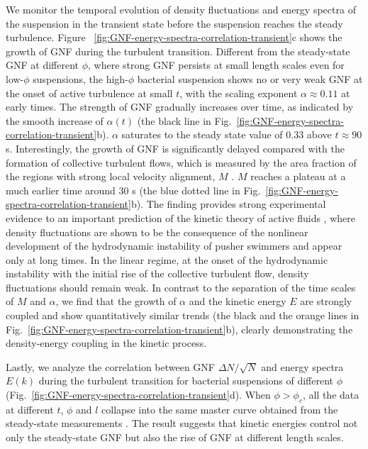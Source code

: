 \documentclass[twocolumn,aps,prx,amsmath,amssymb,longbibliography]{revtex4-2}
\begin{document}
We monitor the temporal evolution of density fluctuations and energy spectra of the suspension in the transient state before the suspension reaches the steady turbulence. Figure ~\ref{fig:GNF-energy-spectra-correlation-transient}c shows the growth of GNF during the turbulent transition. Different from the steady-state GNF at different $\phi$, where strong GNF persists at small length scales even for low-$\phi$ suspensions, the high-$\phi$ bacterial suspension shows no or very weak GNF at the onset of active turbulence at small $t$, with the scaling exponent $\alpha \approx 0.11$ at early times. The strength of GNF gradually increases over time, as indicated by the smooth increase of $\alpha(t)$ (the black line in Fig.~\ref{fig:GNF-energy-spectra-correlation-transient}b). $\alpha$ saturates to the steady state value of 0.33 above $t \approx 90$ s. Interestingly, the growth of GNF is significantly delayed compared with the formation of collective turbulent flows, which is measured by the area fraction of the regions with strong local velocity alignment, $M$ \cite{Cisneros2011, Peng2020, Liu2020}.
$M$ reaches a plateau at a much earlier time around 30 s (the blue dotted line in Fig.~\ref{fig:GNF-energy-spectra-correlation-transient}b). The finding provides strong experimental evidence to an important prediction of the kinetic theory of active fluids \cite{Saintillan2008a,Saintillan2008b}, where density fluctuations are shown to be the consequence of the nonlinear development of the hydrodynamic instability of pusher swimmers and appear only at long times. In the linear regime, at the onset of the hydrodynamic instability with the initial rise of the collective turbulent flow, density fluctuations should remain weak. In contrast to the separation of the time scales of $M$ and $\alpha$, we find that the growth of $\alpha$ and the kinetic energy $E$ are strongly coupled and show quantitatively similar trends (the black and the orange lines in Fig.~\ref{fig:GNF-energy-spectra-correlation-transient}b), clearly demonstrating the density-energy coupling in the kinetic process.

Lastly, we analyze the correlation between GNF $\Delta N/\sqrt N$ and energy spectra $E(k)$ during the turbulent transition for bacterial suspensions of different $\phi$ (Fig.~\ref{fig:GNF-energy-spectra-correlation-transient}d). When $\phi>\phi_c$, all the data at different $t$, $\phi$ and $l$ collapse into the same master curve obtained from the steady-state measurements \cite{Liu2020}.
The result suggests that kinetic energies control not only the steady-state GNF but also the rise of GNF at different length scales.
\end{document}
